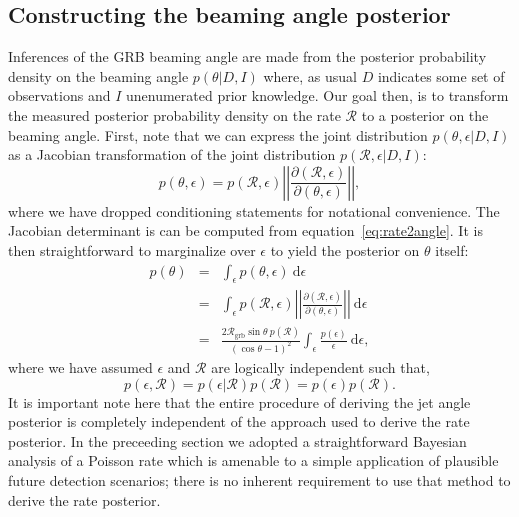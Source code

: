 \documentclass[twocolumn,nofootinbib]{revtex4-1}
\newcommand{\grbrate}{{{\mathcal R}_{\mathrm{grb}}}}
\newcommand{\cbcrate}{{{\mathcal R}}}
\newcommand{\diff}{{\mathrm d}}
\begin{document}
\subsection{Constructing the beaming angle posterior}
Inferences of the GRB beaming angle are made from the posterior probability
density on the beaming angle $p(\theta|D,I)$ where, as usual $D$ indicates some
set of observations and $I$ unenumerated prior knowledge.  Our goal then, is to
transform the measured posterior probability density on the rate $\cbcrate$ to a
posterior on the beaming angle.
%
First, note that we can express the joint distribution $p(\theta, \epsilon|D,I)$
as a Jacobian transformation of the joint distribution $p(\cbcrate,
\epsilon|D,I)$:
\begin{equation}
p(\theta,\epsilon) = p(\cbcrate,\epsilon)
\left\lvert\left\lvert
\frac{\partial(\cbcrate,\epsilon)}{\partial(\theta,\epsilon)}
\right\rvert\right\rvert,
\end{equation}
%
where we have dropped conditioning statements for notational convenience.  The
Jacobian determinant is can be  computed from equation~\ref{eq:rate2angle}.  It
is then straightforward to marginalize over $\epsilon$ to yield the posterior
on $\theta$ itself:
%
\begin{eqnarray}
    \label{eq:beam_posterior}
    p(\theta) & = & \int_{\epsilon} p(\theta,\epsilon)~\diff \epsilon\\
              & = & \int_{\epsilon} p(\cbcrate,\epsilon)
    \left\lvert\left\lvert
    \frac{\partial(\cbcrate,\epsilon)}{\partial(\theta,\epsilon)}
    \right\rvert\right\rvert~\diff \epsilon \\
              & = & \frac{2\grbrate \sin
\theta~p(\cbcrate)}{(\cos\theta-1)^2}\int_{\epsilon}
\frac{p(\epsilon)}{\epsilon} ~\diff \epsilon,
\end{eqnarray}
%
where we have assumed $\epsilon$ and $\cbcrate$ are logically independent such
that,
\begin{equation}
p(\epsilon,\cbcrate) = p(\epsilon|\cbcrate)p(\cbcrate) = p(\epsilon)p(\cbcrate).
\end{equation}
%
It is important note here that the entire procedure of deriving the jet angle
posterior is completely independent of the approach used to derive the rate
posterior. In the preceeding section we adopted a straightforward Bayesian
analysis of a Poisson rate which is amenable to a simple application of plausible
future detection scenarios; there is no inherent requirement to use that method
to derive the rate posterior.
\end{document}
